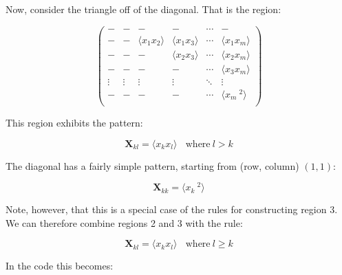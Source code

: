 \documentclass[11pt]{article}
\begin{document}
    Now, consider the triangle off of the diagonal. That is the region:





    \[
\begin{pmatrix}
-         & -        & -                         & -                        & \cdots  & - \\
-         & -        & \langle{x_1 x_2}\rangle   & \langle{x_1 x_3}\rangle  & \cdots  & \langle{x_1 x_m}\rangle\\
-         & -        & -                         & \langle{x_2 x_3}\rangle  & \cdots  & \langle{x_2 x_m}\rangle\\
-         & -        & -                         & -                        & \cdots  & \langle{x_3 x_m}\rangle\\
\vdots    & \vdots   & \vdots                    & \vdots                   & \ddots  & \vdots \\
-         & -        & -                         & -                        & \cdots  & \langle{x_m~^2}\rangle\\
\end{pmatrix}
\]





    This region exhibits the pattern:

\[
\boldsymbol{X}_{k l} = \langle{x_k x_l}\rangle ~~~~\text{where}~ l > k
\]

The diagonal has a fairly simple pattern, starting from (row, column)
\((1,1)\):

\[
\boldsymbol{X}_{k k} = \langle{x_k~^2}\rangle
\]

Note, however, that this is a special case of the rules for constructing
region 3. We can therefore combine regions 2 and 3 with the rule:

\[
\boldsymbol{X}_{k l} = \langle{x_k x_l}\rangle ~~~~\text{where}~ l \geq k
\]

In the code this becomes:
\end{document}
